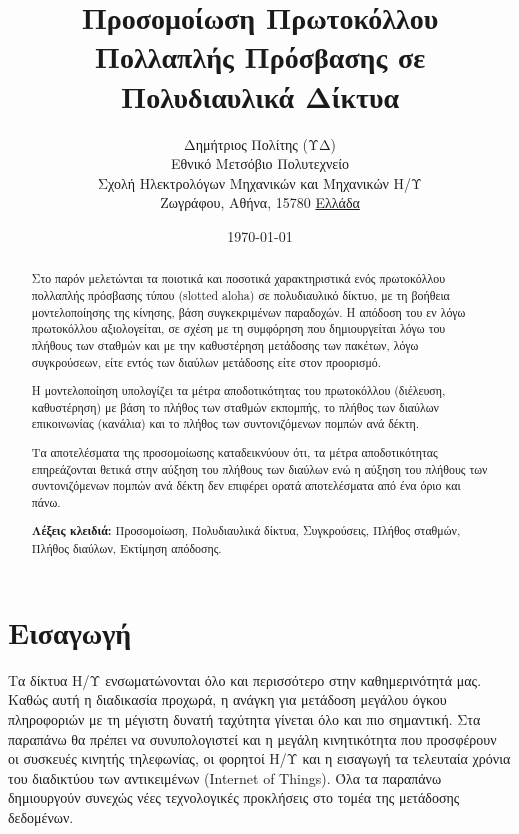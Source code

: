 \documentclass[12pt]{report}
\begin{document}

\title{Προσομοίωση Πρωτοκόλλου Πολλαπλής Πρόσβασης σε Πολυδιαυλικά Δίκτυα}
\author{
        Δημήτριος Πολίτης (ΥΔ)\\
        Εθνικό Μετσόβιο Πολυτεχνείο\\
        Σχολή Ηλεκτρολόγων Μηχανικών και Μηχανικών Η/Υ\\
        Ζωγράφου, Αθήνα, 15780 \underline{Ελλάδα}
}
\date{\today}

\hypersetup{pageanchor=false}

\maketitle

\tableofcontents
\thispagestyle{empty}

\listoftables
\thispagestyle{empty}

\listoffigures
\thispagestyle{empty}

\begin{abstract}
Στο παρόν μελετώνται τα ποιοτικά και ποσοτικά χαρακτηριστικά ενός πρωτοκόλλου πολλαπλής πρόσβασης τύπου (\textlatin{slotted aloha}) σε πολυδιαυλικό δίκτυο, με τη βοήθεια μοντελοποίησης της κίνησης, βάση συγκεκριμένων παραδοχών. Η απόδοση του εν λόγω πρωτοκόλλου αξιολογείται, σε σχέση με τη συμφόρηση που δημιουργείται λόγω του πλήθους των σταθμών και με την καθυστέρηση μετάδοσης των πακέτων, λόγω συγκρούσεων, είτε εντός των διαύλων μετάδοσης είτε στον προορισμό.

Η μοντελοποίηση υπολογίζει τα μέτρα αποδοτικότητας του πρωτοκόλλου (διέλευση, καθυστέρηση) με βάση το πλήθος των σταθμών εκπομπής, το πλήθος των διαύλων επικοινωνίας (κανάλια) και το πλήθος των συντονιζόμενων πομπών ανά δέκτη.

Τα αποτελέσματα της προσομοίωσης καταδεικνύουν ότι, τα μέτρα αποδοτικότητας επηρεάζονται θετικά στην αύξηση του πλήθους των διαύλων ενώ η αύξηση του πλήθους των συντονιζόμενων πομπών ανά δέκτη δεν επιφέρει ορατά αποτελέσματα από ένα όριο και πάνω.

\vspace{10mm}

\noindent \textbf{Λέξεις κλειδιά:} Προσομοίωση, Πολυδιαυλικά δίκτυα, Συγκρούσεις, Πλήθος σταθμών, Πλήθος διαύλων, Εκτίμηση απόδοσης.
\end{abstract}

\hypersetup{pageanchor=true}
\clearpage
{}

\chapter{Εισαγωγή}\label{ch1}
Τα δίκτυα Η/Υ ενσωματώνονται όλο και περισσότερο στην καθημερινότητά μας. Καθώς αυτή η διαδικασία προχωρά, η ανάγκη για μετάδοση μεγάλου όγκου πληροφοριών με τη μέγιστη δυνατή ταχύτητα γίνεται όλο και πιο σημαντική. Στα παραπάνω θα πρέπει να συνυπολογιστεί και η μεγάλη κινητικότητα που προσφέρουν οι συσκευές κινητής τηλεφωνίας, οι φορητοί Η/Υ και η εισαγωγή τα τελευταία χρόνια του διαδικτύου των αντικειμένων (\textlatin{Internet of Things}). Όλα τα παραπάνω δημιουργούν συνεχώς νέες τεχνολογικές προκλήσεις στο τομέα της μετάδοσης δεδομένων.
\end{document}
